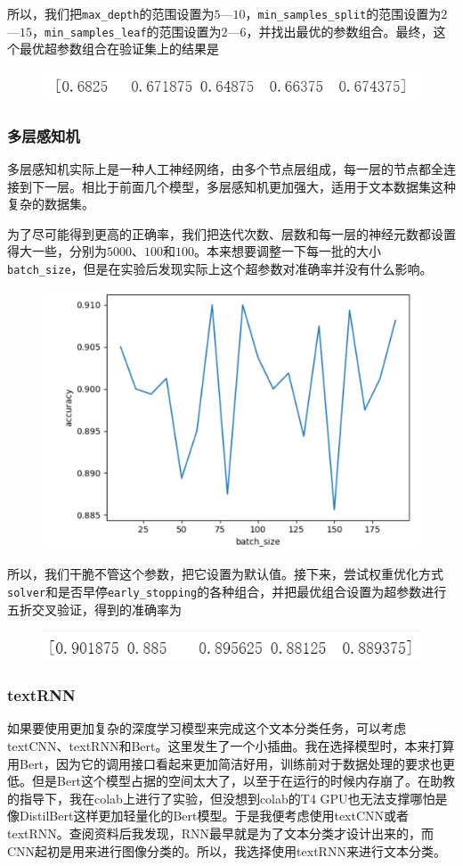 \documentclass{article}
\begin{document}
所以，我们把\lstinline|max_depth|的范围设置为$5$—$10$，\lstinline|min_samples_split|的范围设置为$2$—$15$，\lstinline|min_samples_leaf|的范围设置为$2$—$6$，并找出最优的参数组合。最终，这个最优超参数组合在验证集上的结果是
\begin{figure}[h]
    \centering
    \includegraphics[width=0.5\linewidth]{image9.png}
    \label{fig:enter-label}
\end{figure}
\newpage

\subsubsection{多层感知机}
多层感知机实际上是一种人工神经网络，由多个节点层组成，每一层的节点都全连接到下一层。相比于前面几个模型，多层感知机更加强大，适用于文本数据集这种复杂的数据集。

为了尽可能得到更高的正确率，我们把迭代次数、层数和每一层的神经元数都设置得大一些，分别为$5000$、$100$和$100$。本来想要调整一下每一批的大小\lstinline|batch_size|，但是在实验后发现实际上这个超参数对准确率并没有什么影响。
\begin{figure}[h]
    \centering
    \includegraphics[width=0.5\linewidth]{image10.png}
    \label{fig:enter-label}
\end{figure}

所以，我们干脆不管这个参数，把它设置为默认值。接下来，尝试权重优化方式\lstinline|solver|和是否早停\lstinline|early_stopping|的各种组合，并把最优组合设置为超参数进行五折交叉验证，得到的准确率为
\begin{figure}[h]
    \centering
    \includegraphics[width=0.5\linewidth]{image11.png}
    \label{fig:enter-label}
\end{figure}

\subsubsection{textRNN}
如果要使用更加复杂的深度学习模型来完成这个文本分类任务，可以考虑textCNN、textRNN和Bert。这里发生了一个小插曲。我在选择模型时，本来打算用Bert，因为它的调用接口看起来更加简洁好用，训练前对于数据处理的要求也更低。但是Bert这个模型占据的空间太大了，以至于在运行的时候内存崩了。在助教的指导下，我在colab上进行了实验，但没想到colab的T4 GPU也无法支撑哪怕是像DistilBert这样更加轻量化的Bert模型。于是我便考虑使用textCNN或者textRNN。查阅资料后我发现，RNN最早就是为了文本分类才设计出来的，而CNN起初是用来进行图像分类的。所以，我选择使用textRNN来进行文本分类。
\end{document}

